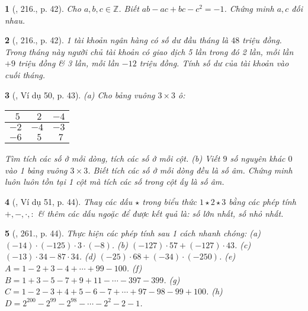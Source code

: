 \documentclass{article}
\newtheorem{baitoan}{}
\begin{document}
\begin{baitoan}[\cite{Tuyen_Toan_6}, 216., p. 42]
	Cho $a,b,c\in\mathbb{Z}$. Biết $ab - ac + bc - c^2 = -1$. Chứng minh $a,c$ đối nhau.
\end{baitoan}

\begin{baitoan}[\cite{Tuyen_Toan_6}, 216., p. 42]
	1 tài khoản ngân hàng có số dư đầu tháng là $48$ triệu đồng. Trong tháng này người chủ tài khoản có giao dịch 5 lần trong đó 2 lần, mỗi lần $+9$ triệu đồng \& 3 lần, mỗi lần $-12$ triệu đồng. Tính số dư của tài khoản vào cuối tháng.
\end{baitoan}

\begin{baitoan}[\cite{Binh_Toan_6_tap_1}, Ví dụ 50, p. 43]
	(a) Cho bảng vuông $3\times 3$ ô:
	\begin{table}[H]
		\centering
		\begin{tabular}{|c|c|c|}
			\hline
			$\ \ 5$ & $\ \ 2$ & $-4$ \\
			\hline
			$-2$ & $-4$ & $-3$ \\
			\hline
			$-6$ & $\ \ 5$ & $\ \ 7$ \\
			\hline
		\end{tabular}
	\end{table}
	\noindent Tìm tích các số ở mỗi dòng, tích các số ở mỗi cột. (b) Viết $9$ số nguyên khác $0$ vào 1 bảng vuông $3\times 3$. Biết tích các số ở mỗi dòng đều là số âm. Chứng minh luôn luôn tồn tại 1 cột mà tích các số trong cột ấy là số âm.
\end{baitoan}

\begin{baitoan}[\cite{Binh_Toan_6_tap_1}, Ví dụ 51, p. 44]
	Thay các dấu $\star$ trong biểu thức $1\star2\star3$ bằng các phép tính $+,-,\cdot,:$ \& thêm các dấu ngoặc để được kết quả là: số lớn nhất, số nhỏ nhất.
\end{baitoan}

\begin{baitoan}[\cite{Binh_Toan_6_tap_1}, 261., p. 44]
	Thực hiện các phép tính sau 1 cách nhanh chóng: (a) $(-14)\cdot(-125)\cdot3\cdot(-8)$. (b) $(-127)\cdot57 + (-127)\cdot43$. (c) $(-13)\cdot34 - 87\cdot34$. (d) $(-25)\cdot68 + (-34)\cdot(-250)$. (e) $A = 1 - 2 + 3 - 4 + \cdots + 99 - 100$. (f) $B = 1 + 3 - 5 - 7 + 9 + 11 - \cdots - 397 - 399$. (g) $C = 1 - 2 - 3 + 4 + 5 - 6 - 7 + \cdots + 97 - 98 - 99 + 100$. (h) $D = 2^{200} - 2^{99} - 2^{98} - \cdots - 2^2 - 2 - 1$.
\end{baitoan}
\end{document}
